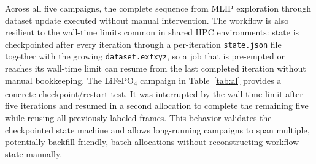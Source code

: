 \documentclass[11pt,a4paper]{article}
\def\ac#1{#1}%
\def\acs#1{#1}%
\begin{document}
Across all five campaigns, the complete sequence from \ac{MLIP} exploration
through dataset update executed without manual intervention. The workflow is
also resilient to the wall-time limits common in shared \ac{HPC} environments:
state is checkpointed after every iteration through a per-iteration
\texttt{state.json} file together with the growing \texttt{dataset.extxyz}, so a
job that is pre-empted or reaches its wall-time limit can resume from the last
completed iteration without manual bookkeeping. The LiFePO\textsubscript{4}
campaign in Table~\ref{tab:al} provides a concrete checkpoint/restart test. It
was interrupted by the wall-time limit after five iterations and resumed in a
second allocation to complete the remaining five while reusing all previously
labeled frames. This behavior validates the checkpointed state machine and
allows long-running campaigns to span multiple, potentially backfill-friendly,
batch allocations without reconstructing workflow state manually.


\end{document}
